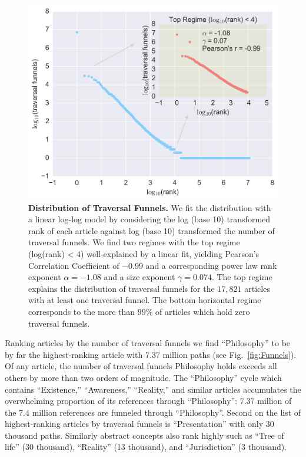 \documentclass[11pt]{report}
\begin{document}
\begin{figure}[tp!]
  \includegraphics[width=\columnwidth]{graphics/funnels_distribution.png}
  \caption{
    \textbf{Distribution of Traversal Funnels.}
We fit the distribution with a linear log-log model by considering the log (base 10) transformed rank of each article against log (base 10) transformed the number of traversal funnels. 
We find two regimes with the top regime (log(rank) < 4) 
well-explained by a linear fit, yielding Pearson's 
Correlation Coefficient of $-0.99$ and a 
corresponding power law rank exponent $\alpha = -1.08$
and a size exponent $\gamma = 0.074$. The top regime 
explains the distribution of traversal funnels for the $17, 821$ 
articles with at least one traversal funnel. The bottom 
horizontal regime corresponds to the more than $99\%$ of articles
which hold zero traversal funnels.}
  \label{fig:Funnels Distribution}
\end{figure}
Ranking articles by the number of traversal funnels we find 
``Philosophy'' to be by far the highest-ranking article with 
$7.37$ million paths
(see Fig.~\ref{fig:Funnels}).
Of any article, the number of traversal funnels Philosophy holds exceeds 
all others by more than two orders of magnitude.
The ``Philosophy'' cycle which contains ``Existence,'' ``Awareness,'' ``Reality,'' 
and similar articles accumulates the overwhelming proportion of its 
references through ``Philosophy'': $7.37$ million of the $7.4$ million references
are funneled through ``Philosophy''.
Second on the list of highest-ranking articles by traversal funnels is 
``Presentation'' with only $30$ thousand paths. Similarly abstract 
concepts also rank highly such as ``Tree of life'' (30 thousand), 
``Reality'' (13 thousand), and ``Jurisdiction'' (3 thousand).
\end{document}
